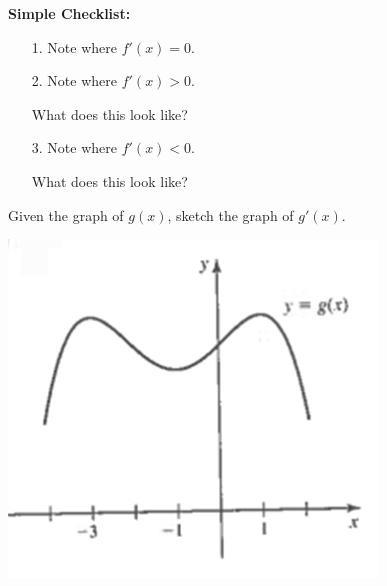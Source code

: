 \documentclass[cal1spr16Lectures.tex]{subfiles}
\begin{document}
\begin{frame}{}{}
{\bf Simple Checklist:} 
\begin{itemize}
\item[1. ] Note where $f'(x)=0$.
\item[2. ] Note where $f'(x)>0$. 
\begin{que} What does this look like? \end{que}
\item[3. ] Note where $f'(x)<0$.
\begin{que} What does this look like? \end{que}
\end{itemize}
\end{frame}

\begin{frame}{}
\begin{ex}
Given the graph of $g(x)$, sketch the graph of $g'(x)$.

\begin{center}
\includegraphics[scale=0.9]{pictures/Ch3Sect2new1}
\end{center}
\end{ex}
\end{frame}
\end{document}
